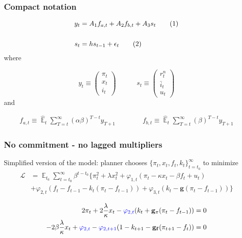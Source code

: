 \documentclass[11pt]{beamer}
\DeclareMathOperator{\E}{\mathbb{E}}
\newcommand\numberthis{\addtocounter{equation}{1}\tag{\theequation}} %
\begin{document}
\begin{frame}
	\frametitle{Compact notation}
	\label{compact}

 \begin{align*}
y_t & = A_1 f_{a,t} + A_2 f_{b,t} + A_3 s_t \label{LOM_LR} \numberthis \\
\\
s_t & = h s_{t-1} + \epsilon_t \label{exog} \numberthis
\end{align*}
where

\begin{equation}
 y_t \equiv \begin{pmatrix} \pi_t \\ x_t \\ i_t
 \end{pmatrix} 
 \quad \quad \quad 
  s_t  \equiv \begin{pmatrix} r_t^n \\ \bar{i}_t \\ u_t 
 \end{pmatrix} 
\end{equation}
and

  \begin{align}
f_{a,t}  \equiv  \hat{\E}_t\sum_{T=t}^{\infty} (\alpha\beta)^{T-t } y_{T+1} \quad \quad \quad \quad 
f_{b,t}  \equiv \hat{\E}_t\sum_{T=t}^{\infty} (\beta)^{T-t } y_{T+1} \label{fafb}
\end{align}

\hyperlink{aggregate_LOMS}{}	


\end{frame}



\begin{frame}
	\frametitle{No commitment - no lagged multipliers}
	\label{no_commitment_intuition}
	
	Simplified version of the model: planner chooses $\{\pi_t, x_t, f_t, k_t\}_{t=t_0}^{\infty}$ to minimize
 \begin{align*}
\mathcal{L} &= \E_{t_0}\sum_{t=t_0}^{\infty} \beta^{t-t_0}\bigg\{ \pi_t^2  + \lambda x_t^2 + \varphi_{1,t} (\pi_t -\kappa x_t- \beta f_t +u_t) \\ &+ \varphi_{2,t}(f_t - f_{t-1} -k_t(\pi_t - f_{t-1})) + \varphi_{3,t}(k_t- \mathbf{g}(\pi_t - f_{t-1})) \bigg\}
 \end{align*}

 \begin{align}
  2\pi_t +2\frac{\lambda}{\kappa}x_t -\textcolor{blue}{\varphi_{2,t}}(k_t + \mathbf{g_{\pi}}(\pi_t -f_{t-1}))& = 0 \label{simpleFOC1} \\
  -2\beta\frac{\lambda}{\kappa}x_t + \textcolor{blue}{\varphi_{2,t}} -\textcolor{blue}{\varphi_{2,t+1}}(1-k_{t+1} -\mathbf{g_{f}}(\pi_{t+1} -f_{t})) & = 0 \label{simpleFOC2} 
 \end{align}

  
\hyperlink{no_commitment}{}	


\end{frame}
\end{document}
